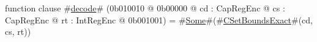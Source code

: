 function clause #\hyperref[sailMIPSzdecode]{decode}# (0b010010 @ 0b00000 @ cd : CapRegEnc @ cs : CapRegEnc @ rt : IntRegEnc @ 0b001001) = #\hyperref[sailMIPSzSome]{Some}#(#\hyperref[sailMIPSzCSetBoundsExact]{CSetBoundsExact}#(cd, cs, rt))
